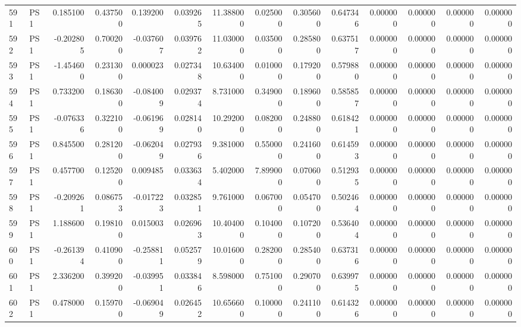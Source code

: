 \begin{tabular}{llrrrrrrrrrrrr}
591 &    PS1 &  0.185100 &      0.437500 &  0.139200 &    0.039265 &  11.388000 &      0.025000 &   0.305600 &  0.647346 &  0.000000 &   0.000000 &     0.000000 &     0.000000 \\
592 &    PS1 & -0.202805 &      0.700200 & -0.037607 &    0.039762 &  11.030000 &      0.035000 &   0.285800 &  0.637517 &  0.000000 &   0.000000 &     0.000000 &     0.000000 \\
593 &    PS1 & -1.454600 &      0.231300 &  0.000023 &    0.027348 &  10.634000 &      0.010000 &   0.179200 &  0.579880 &  0.000000 &   0.000000 &     0.000000 &     0.000000 \\
594 &    PS1 &  0.733200 &      0.186300 & -0.084009 &    0.029374 &   8.731000 &      0.349000 &   0.189600 &  0.585857 &  0.000000 &   0.000000 &     0.000000 &     0.000000 \\
595 &    PS1 & -0.076336 &      0.322100 & -0.061969 &    0.028140 &  10.292000 &      0.082000 &   0.248800 &  0.618421 &  0.000000 &   0.000000 &     0.000000 &     0.000000 \\
596 &    PS1 &  0.845500 &      0.281200 & -0.062049 &    0.027936 &   9.381000 &      0.550000 &   0.241600 &  0.614593 &  0.000000 &   0.000000 &     0.000000 &     0.000000 \\
597 &    PS1 &  0.457700 &      0.125200 &  0.009485 &    0.033634 &   5.402000 &      7.899000 &   0.070600 &  0.512935 &  0.000000 &   0.000000 &     0.000000 &     0.000000 \\
598 &    PS1 & -0.209261 &      0.086753 & -0.017223 &    0.032851 &   9.761000 &      0.067000 &   0.054700 &  0.502464 &  0.000000 &   0.000000 &     0.000000 &     0.000000 \\
599 &    PS1 &  1.188600 &      0.198100 &  0.015003 &    0.026963 &  10.404000 &      0.104000 &   0.107200 &  0.536404 &  0.000000 &   0.000000 &     0.000000 &     0.000000 \\
600 &    PS1 & -0.261394 &      0.410900 & -0.258811 &    0.052579 &  10.016000 &      0.282000 &   0.285400 &  0.637316 &  0.000000 &   0.000000 &     0.000000 &     0.000000 \\
601 &    PS1 &  2.336200 &      0.399200 & -0.039951 &    0.033846 &   8.598000 &      0.751000 &   0.290700 &  0.639975 &  0.000000 &   0.000000 &     0.000000 &     0.000000 \\
602 &    PS1 &  0.478000 &      0.159700 & -0.069049 &    0.026452 &  10.656600 &      0.100000 &   0.241100 &  0.614326 &  0.000000 &   0.000000 &     0.000000 &     0.000000 \\

\end{tabular}
